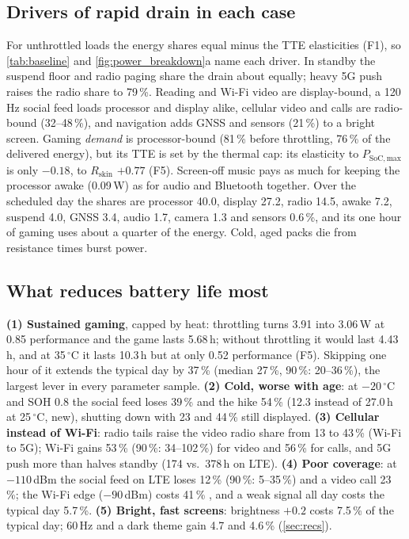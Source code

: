 \subsection{Drivers of rapid drain in each case}\label{sec:drivers}
For unthrottled loads the energy shares equal minus the TTE elasticities (F1), so \cref{tab:baseline} and
\cref{fig:power_breakdown}a name each driver. In standby the suspend floor and radio paging share the drain about
equally; heavy 5G push raises the radio share to 79\,\%. Reading and Wi-Fi video are display-bound, a 120\,Hz
social feed loads processor and display alike, cellular video and calls are radio-bound (32--48\,\%), and
navigation adds GNSS and sensors (21\,\%) to a bright screen. Gaming \emph{demand} is processor-bound (81\,\%
before throttling, 76\,\% of the delivered energy), but its TTE is set by the thermal cap: its elasticity to
$P_{\mathrm{SoC,max}}$ is only $-0.18$, to $R_{\mathrm{skin}}$ $+0.77$ (F5). Screen-off music pays as much for
keeping the processor awake (0.09\,W) as for audio and Bluetooth together. Over the scheduled day the shares are
processor 40.0, display 27.2, radio 14.5, awake 7.2, suspend 4.0, GNSS 3.4, audio 1.7, camera 1.3 and sensors
0.6\,\%, and its one hour of gaming uses about a quarter of the energy. Cold, aged packs die from resistance times
burst power.

\subsection{What reduces battery life most}\label{sec:most}
\textbf{(1) Sustained gaming}, capped by heat: throttling turns 3.91 into 3.06\,W at 0.85 performance and the game
lasts 5.68\,h; without throttling it would last 4.43\,h, and at 35\,$^\circ$C it lasts 10.3\,h but at only 0.52
performance (F5). Skipping one hour of it extends the typical day by 37\,\% (median 27\,\%, 90\,\%: 20--36\,\%),
the largest lever in every parameter sample. \textbf{(2) Cold, worse with age}: at $-20\,^\circ$C and SOH 0.8 the
social feed loses 39\,\% and the hike 54\,\% (12.3 instead of 27.0\,h at 25\,$^\circ$C, new), shutting down with
23 and 44\,\% still displayed. \textbf{(3) Cellular instead of Wi-Fi}: radio tails \cite{HU12,NA21} raise the
video radio share from 13 to 43\,\% (Wi-Fi to 5G); Wi-Fi gains 53\,\% (90\,\%: 34--102\,\%) for video and 56\,\%
for calls, and 5G push more than halves standby (174 vs.\ 378\,h on LTE). \textbf{(4) Poor coverage}: at
$-110$\,dBm the social feed on LTE loses 12\,\% (90\,\%: 5--35\,\%) and a video call 23\,\%; the Wi-Fi edge
($-90$\,dBm) costs 41\,\% \cite{DI13}, and a weak signal all day costs the typical day 5.7\,\%.
\textbf{(5) Bright, fast screens}: brightness $+0.2$ costs 7.5\,\% of the typical day; 60\,Hz and a dark theme
gain 4.7 and 4.6\,\% (\cref{sec:recs}).

